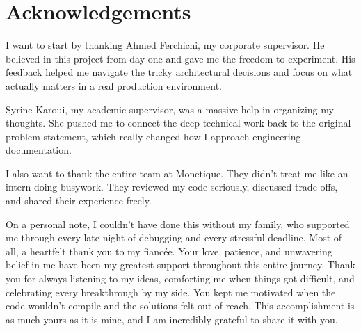 \documentclass[12pt,a4paper]{report}
\begin{document}



\chapter*{Acknowledgements}

I want to start by thanking Ahmed Ferchichi, my corporate supervisor. He believed in this project from day one and gave me the freedom to experiment. His feedback helped me navigate the tricky architectural decisions and focus on what actually matters in a real production environment. 

Syrine Karoui, my academic supervisor, was a massive help in organizing my thoughts. She pushed me to connect the deep technical work back to the original problem statement, which really changed how I approach engineering documentation.

I also want to thank the entire team at Monetique. They didn't treat me like an intern doing busywork. They reviewed my code seriously, discussed trade-offs, and shared their experience freely. 

On a personal note, I couldn't have done this without my family, who supported me through every late night of debugging and every stressful deadline. Most of all, a heartfelt thank you to my fiancée. Your love, patience, and unwavering belief in me have been my greatest support throughout this entire journey. Thank you for always listening to my ideas, comforting me when things got difficult, and celebrating every breakthrough by my side. You kept me motivated when the code wouldn't compile and the solutions felt out of reach. This accomplishment is as much yours as it is mine, and I am incredibly grateful to share it with you.

\newpage

\tableofcontents
\newpage

\listoffigures
{}
\newpage
\end{document}
